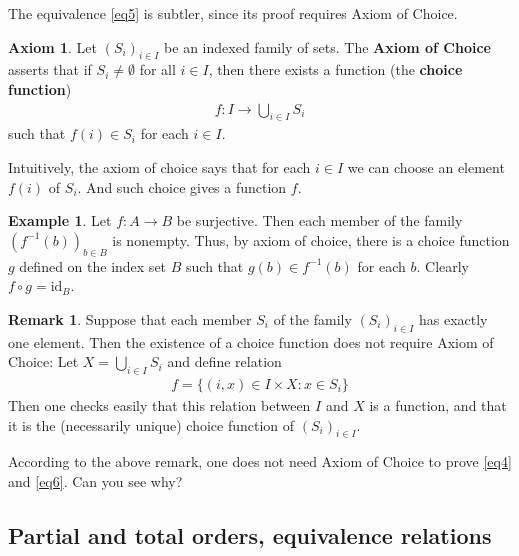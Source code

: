 \documentclass[12pt,b5paper,notitlepage]{article}
\theoremstyle{definition}
\newtheorem{eg}[df]{Example}
\newtheorem{rem}[df]{Remark}
\newtheorem*{axiom}{Axiom}
\theoremstyle{plain}
\newcommand{\id}{\mathrm{id}}
\numberwithin{equation}{section}
\begin{document}
The equivalence \eqref{eq5} is subtler, since its proof requires Axiom of Choice.


\begin{axiom}
Let $(S_i)_{i\in I}$ be an indexed family of sets. The \textbf{Axiom of Choice} asserts that if $S_i\neq\emptyset$ for all $i\in I$, then there exists a function (the \textbf{choice function})
\begin{align*}
f:I\rightarrow \bigcup_{i\in I}S_i
\end{align*}
such that $f(i)\in S_i$ for each $i\in I$.
\end{axiom}


Intuitively, the axiom of choice says that for each $i\in I$ we can choose an element $f(i)$ of $S_i$. And such choice gives a function $f$.


\begin{eg}
Let $f:A\rightarrow B$ be surjective. Then each member of the family $(f^{-1}(b))_{b\in B}$ is nonempty. Thus, by axiom of choice, there is a choice function $g$ defined on the index set $B$ such that $g(b)\in f^{-1}(b)$ for each $b$. Clearly $f\circ g=\id_B$.
\end{eg}



\begin{rem}
Suppose that each member $S_i$ of the family $(S_i)_{i\in I}$ has exactly one element. Then the existence of a choice function does not require Axiom of Choice: Let $X=\bigcup_{i\in I}S_i$ and define relation
\begin{align*}
f=\{(i,x)\in I\times X: x\in S_i\}
\end{align*}
Then one checks easily that this relation between $I$ and $X$ is a function, and that it is the (necessarily unique) choice function of $(S_i)_{i\in I}$.
\end{rem}

According to the above remark, one does not need Axiom of Choice to prove \eqref{eq4} and \eqref{eq6}. Can you see why?


\subsection{Partial and total orders, equivalence relations}\label{lb299}
\end{document}
